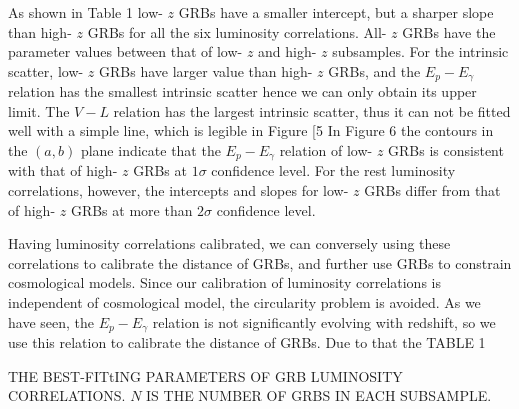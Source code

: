\documentclass[10pt, a4paper]{article}
\begin{document}
As shown in Table 1 low- $z$ GRBs have a smaller intercept, but a sharper slope than high- $z$ GRBs for all the six luminosity correlations. All- $z$ GRBs have the parameter values between that of low- $z$ and high- $z$ subsamples. For the intrinsic scatter, low- $z$ GRBs have larger value than high- $z$ GRBs, and the $E_{p}-E_{\gamma}$ relation has the smallest intrinsic scatter hence we can only obtain its upper limit. The $V-L$ relation has the largest intrinsic scatter, thus it can not be fitted well with a simple line, which is legible in Figure [5 In Figure 6 the contours in the $(a, b)$ plane indicate that the $E_{p}-E_{\gamma}$ relation of low- $z$ GRBs is consistent with that of high- $z$ GRBs at $1 \sigma$ confidence level. For the rest luminosity correlations, however, the intercepts and slopes for low- $z$ GRBs differ from that of high- $z$ GRBs at more than $2 \sigma$ confidence level.

Having luminosity correlations calibrated, we can conversely using these correlations to calibrate the distance of GRBs, and further use GRBs to constrain cosmological models. Since our calibration of luminosity correlations is independent of cosmological model, the circularity problem is avoided. As we have seen, the $E_{p}-E_{\gamma}$ relation is not significantly evolving with redshift, so we use this relation to calibrate the distance of GRBs. Due to that the TABLE 1

THE BEST-FITtING PARAMETERS OF GRB LUMINOSITY CORRELATIONS. $N$ IS THE NUMBER OF GRBS IN EACH SUBSAMPLE.
\end{document}
